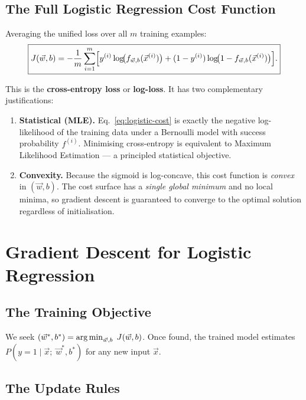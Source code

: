 \subsection{The Full Logistic Regression Cost Function}

Averaging the unified loss over all $m$ training examples:
\begin{equation}
\boxed{J(\vec{w},b)=-\frac{1}{m}\sum_{i=1}^m\Bigl[
y^{(i)}\log\!\bigl(f_{\vec{w},b}(\vec{x}^{(i)})\bigr)
+(1-y^{(i)})\log\!\bigl(1-f_{\vec{w},b}(\vec{x}^{(i)})\bigr)\Bigr].}
\label{eq:logistic-cost}
\end{equation}

This is the \textbf{cross-entropy loss} or \textbf{log-loss}. It has two
complementary justifications:
\begin{enumerate}
\item \textbf{Statistical (MLE).} Eq.~\eqref{eq:logistic-cost} is exactly the
  negative log-likelihood of the training data under a Bernoulli model with
  success probability $f^{(i)}$. Minimising cross-entropy is equivalent to
  Maximum Likelihood Estimation — a principled statistical objective.
\item \textbf{Convexity.} Because the sigmoid is log-concave, this cost
  function is \emph{convex} in $(\vec{w},b)$. The cost surface has a
  \emph{single global minimum} and no local minima, so gradient descent is
  guaranteed to converge to the optimal solution regardless of initialisation.
\end{enumerate}

\section{Gradient Descent for Logistic Regression}
\label{sec:loggd}

\subsection{The Training Objective}

We seek $(\vec{w}^*,b^*)=\operatorname*{arg\,min}_{\vec{w},b}\;J(\vec{w},b)$.
Once found, the trained model estimates
$P(y=1\mid\vec{x};\;\vec{w}^*,b^*)$ for any new input $\vec{x}$.

\subsection{The Update Rules}

